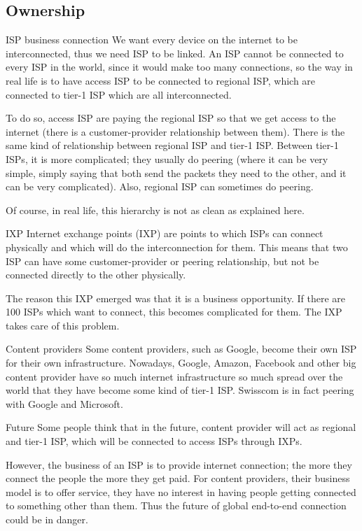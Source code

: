 \documentclass[a4paper]{article}
\begin{document}
\subsection{Ownership}
\begin{parag}{ISP business connection}
    We want every device on the internet to be interconnected, thus we need ISP to be linked. An ISP cannot be connected to every ISP in the world, since it would make too many connections, so the way in real life is to have access ISP to be connected to regional ISP, which are connected to tier-1 ISP which are all interconnected.

    To do so, access ISP are paying the regional ISP so that we get access to the internet (there is a customer-provider relationship between them). There is the same kind of relationship between regional ISP and tier-1 ISP. Between tier-1 ISPs, it is more complicated; they usually do peering (where it can be very simple, simply saying that both send the packets they need to the other, and it can be very complicated). Also, regional ISP can sometimes do peering.

    Of course, in real life, this hierarchy is not as clean as explained here.
\end{parag}

\begin{parag}{IXP}
    Internet exchange points (IXP) are points to which ISPs can connect physically and which will do the interconnection for them. This means that two ISP can have some customer-provider or peering relationship, but not be connected directly to the other physically.

    The reason this IXP emerged was that it is a business opportunity. If there are 100 ISPs which want to connect, this becomes complicated for them. The IXP takes care of this problem.
\end{parag}

\begin{parag}{Content providers}
    Some content providers, such as Google, become their own ISP for their own infrastructure. Nowadays, Google, Amazon, Facebook and other big content provider have so much internet infrastructure so much spread over the world that they have become some kind of tier-1 ISP. Swisscom is in fact peering with Google and Microsoft.
\end{parag}

\begin{parag}{Future}
    Some people think that in the future, content provider will act as regional and tier-1 ISP, which will be connected to access ISPs through IXPs.


    However, the business of an ISP is to provide internet connection; the more they connect the people the more they get paid. For content providers, their business model is to offer service, they have no interest in having people getting connected to something other than them. Thus the future of global end-to-end connection could be in danger.
\end{parag}
\end{document}
